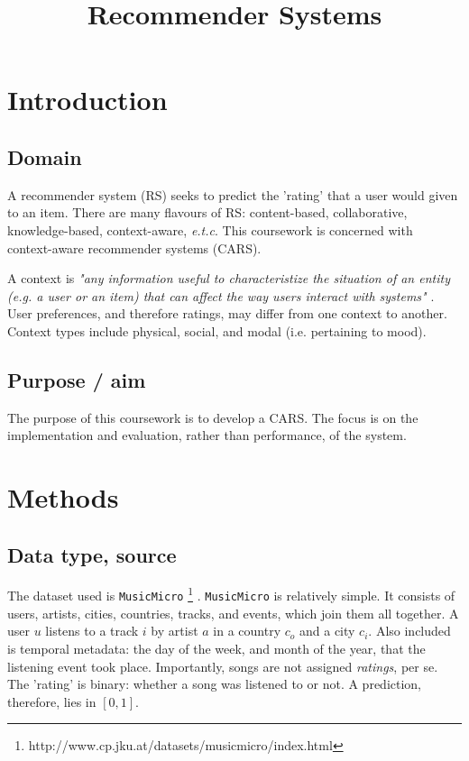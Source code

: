 \documentclass[conference]{IEEEtran}
\begin{document}
\title{Recommender Systems}

\author{}

\maketitle

\section{Introduction}

\subsection{Domain}

A recommender system (RS) seeks to predict the 'rating' that a user would given to an item. There are many flavours of RS: content-based, collaborative, knowledge-based, context-aware, \textit{e.t.c}. This coursework is concerned with context-aware recommender systems (CARS). 

A context is \textit{"any information useful to characteristize the situation of an entity (e.g. a user or an item) that can affect the way users interact with systems"} \cite{abowd_et_al_1999}. User preferences, and therefore ratings, may differ from one context to another. Context types include physical, social, and modal (i.e. pertaining to mood). 

\subsection{Purpose / aim}

The purpose of this coursework is to develop a CARS. The focus is on the implementation and evaluation, rather than performance, of the system. 

\section{Methods}

\subsection{Data type, source}

The dataset used is \verb|MusicMicro| \footnote{http://www.cp.jku.at/datasets/musicmicro/index.html} \cite{schedl_2013}. \verb|MusicMicro| is relatively simple. It consists of users, artists, cities, countries, tracks, and events, which join them all together. A user $u$ listens to a track $i$ by artist $a$ in a country $c_o$ and a city $c_i$. Also included is temporal metadata: the day of the week, and month of the year, that the listening event took place. Importantly, songs are not assigned \textit{ratings}, per se. The 'rating' is binary: whether a song was listened to or not. A prediction, therefore, lies in $[0, 1]$.
\end{document}
